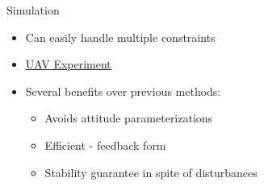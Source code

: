 \documentclass[11pt,professionalfonts]{beamer}
\begin{document}
\begin{frame}{Simulation} %
\begin{itemize}
	\item Can easily handle multiple constraints
	\item \href{https://youtu.be/dsmAbwQram4?t=20s}{UAV Experiment}
	\item Several benefits over previous methods:
		\begin{itemize}
			\item Avoids attitude parameterizations
			\item Efficient - feedback form
			\item Stability guarantee in spite of disturbances
		\end{itemize}
\end{itemize} 
\end{frame}%
\end{document}
